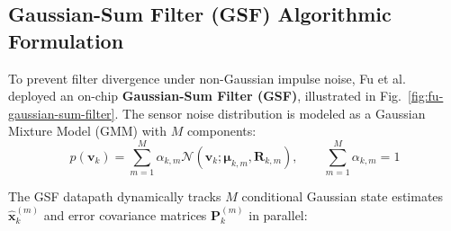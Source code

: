 \subsection{Gaussian-Sum Filter (GSF) Algorithmic Formulation}
To prevent filter divergence under non-Gaussian impulse noise, Fu et al.~\cite{Fu2019} deployed an on-chip \textbf{Gaussian-Sum Filter (GSF)}, illustrated in Fig.~\ref{fig:fu-gaussian-sum-filter}. The sensor noise distribution is modeled as a Gaussian Mixture Model (GMM) with $M$ components:
\begin{equation}
    p(\mathbf{v}_k) = \sum_{m=1}^M \alpha_{k,m} \mathcal{N}(\mathbf{v}_k; \boldsymbol{\mu}_{k,m}, \mathbf{R}_{k,m}), \qquad \sum_{m=1}^M \alpha_{k,m} = 1
    \label{eq:gmm-noise}
\end{equation}

The GSF datapath dynamically tracks $M$ conditional Gaussian state estimates $\hat{\mathbf{x}}_k^{(m)}$ and error covariance matrices $\mathbf{P}_k^{(m)}$ in parallel:

